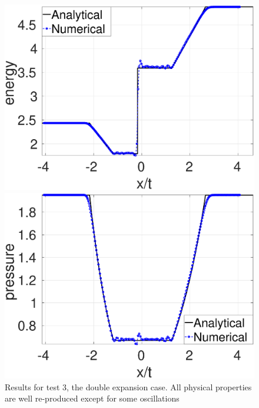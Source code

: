 \begin{figure}
\begin{minipage}{.495\textwidth}
        \includegraphics[width=0.99 \textwidth]{Chapter-4/Figures/double_exp/Dexp-RCM-e}
    \end{minipage}%
    \begin{minipage}{.495 \textwidth}
        \centering
        \includegraphics[width=0.99 \textwidth]{Chapter-4/Figures/double_exp/Dexp-RCM-p}
    \end{minipage}%
    \caption{Results for test 3, the double expansion case. All physical properties are well re-produced except for some oscillations}
    \label{fig:RCM-double-expansion}
\end{figure}

